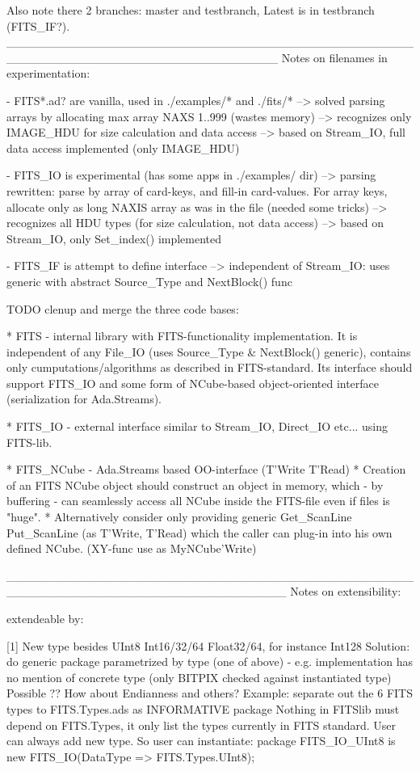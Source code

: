 
Also note there 2 branches: master and testbranch, Latest is in testbranch (FITS_IF?).
________________________________________________________________________________
Notes on filenames in experimentation:

- FITS*.ad? are vanilla, used in ./examples/* and ./fits/* 
            --> solved parsing arrays by allocating max array NAXS 1..999 (wastes memory)
            --> recognizes only IMAGE_HDU for size calculation and data access
            --> based on Stream_IO, full data access implemented (only IMAGE_HDU)

- FITS_IO is experimental (has some apps in ./examples/ dir)
            --> parsing rewritten: parse by array of card-keys, and fill-in card-values.
            For array keys, allocate only as long NAXIS array as was in the file (needed some tricks)
            --> recognizes all HDU types (for size calculation, not data access)
            --> based on Stream_IO, only Set_index() implemented

- FITS_IF is attempt to define interface
            --> independent of Stream_IO: uses generic with abstract Source_Type and NextBlock() func

TODO clenup and merge the three code bases:

* FITS - internal library with FITS-functionality implementation.
         It is independent of any File_IO (uses Source_Type & NextBlock() generic),
         contains only cumputations/algorithms as described in FITS-standard.
         Its interface should support FITS_IO and some form of 
         NCube-based object-oriented interface (serialization for Ada.Streams).

* FITS_IO - external interface similar to Stream_IO, Direct_IO etc... using FITS-lib.

* FITS_NCube - Ada.Streams based OO-interface (T'Write T'Read)
         * Creation of an FITS NCube object should construct an object in memory,
         which -  by buffering - can seamlessly access all NCube inside the FITS-file
         even if files is "huge".
         * Alternatively consider only providing generic Get_ScanLine Put_ScanLine 
	(as T'Write, T'Read) which the caller can plug-in into his own defined NCube.
         (XY-func use as MyNCube'Write)


_________________________________________________________________________________
Notes on extensibility:

extendeable by:

[1] 
New type besides UInt8 Int16/32/64 Float32/64, for instance Int128
Solution: do generic package parametrized by type (one of above) - e.g.
implementation has no mention of concrete type (only BITPIX checked against
instantiated type) Possible ?? How about Endianness and others?
Example: separate out the 6 FITS types to FITS.Types.ads as INFORMATIVE package
Nothing in FITSlib must depend on FITS.Types, it only list the types currently
in FITS standard. User can always add new type.
So user can instantiate:
package FITS_IO_UInt8 is new FITS_IO(DataType => FITS.Types.UInt8);

